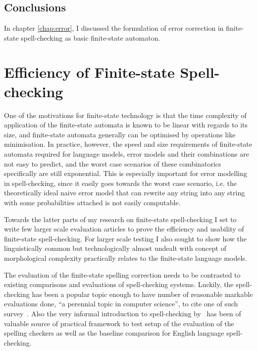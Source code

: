 \documentclass[officiallayout]{unihelcompling}
\begin{document}
\section{Conclusions}

In chapter \ref{chap:error}, I discussed the formulation of error correction in
finite-state spell-checking as basic finite-state automaton. 

\chapter{Efficiency of Finite-state Spell-checking}
\label{chap:efficiency}

One of the motivations for finite-state technology is that the time complexity
of application of the finite-state automata is known to be linear with regards
to its size, and finite-state automata generally can be optimised by operations
like minimisation. In practice, however, the speed and size requirements of
finite-state automata required for language models, error models and their
combinations are not easy to predict, and the worst case scenarios of these
combinatorics specifically are still exponential. This is especially important
for error modelling in spell-checking, since it easily goes towards the worst
case scenario, i.e. the theoretically ideal naive error model that can rewrite
any string into any string with some probabilities attached is not easily
computable.

Towards the latter parts of my research on finite-state spell-checking I set to
write few larger scale evaluation articles to prove the efficiency and
usability of finite-state spell-checking. For larger scale testing I also
sought to show how the linguistically common but technologically almost
undealt with concept of morphological complexity practically relates to the
finite-state language models.

The evaluation of the finite-state spelling correction needs to be contrasted
to existing comparisons and evaluations of spell-checking systems. Luckily, the
spell-checking has been a popular topic enough to have number of reasonable
markable evaluations done, ``a perennial topic in computer science'', to cite
one of such survey~\citep{kukich1992spelling}. Also the very informal
introduction to spell-checking by~\citep{norvig2010howto} has been of valuable
source of practical framework to test setup of the evaluation of the spelling
checkers as well as the baseline comparison for English language
spell-checking.
\end{document}
